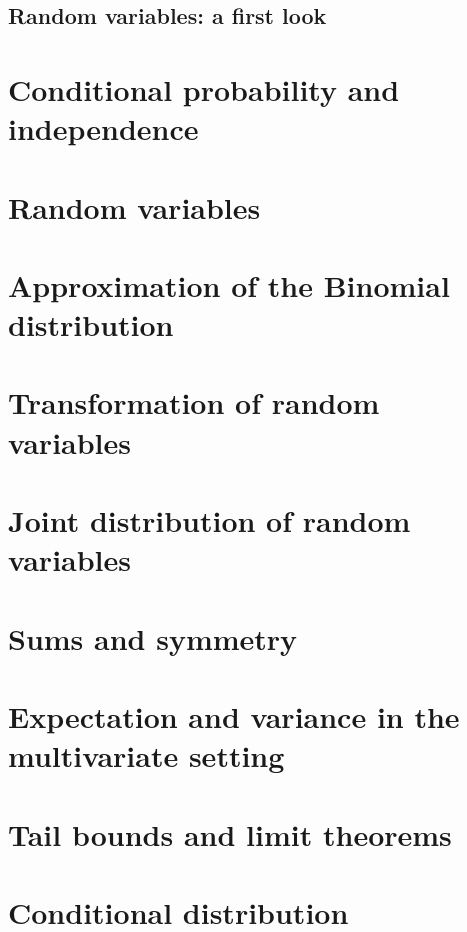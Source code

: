   \subsection{Random variables: a first look}
  \label{subsec:1.5}



\section{Conditional probability and independence}
\label{sec:cond-prob-indep}


\section{Random variables}
\label{sec:random-variables}


\section{Approximation of the Binomial distribution}
\label{sec:appr-binom-distr}


\section{Transformation of random variables}
\label{sec:transf-rand-vari}


\section{Joint distribution of random variables}
\label{sec:joint-distr-rand}


\section{Sums and symmetry}
\label{sec:sums-symmetry}


\section{Expectation and variance in the multivariate setting}
\label{sec:expect-vari-mult}


\section{Tail bounds and limit theorems}
\label{sec:tail-bounds-limit}


\section{Conditional distribution}
\label{sec:cond-distr}





